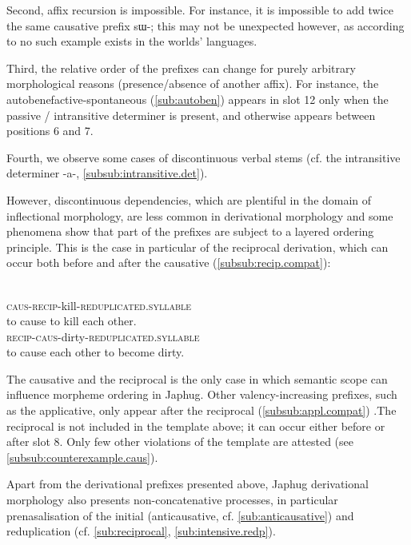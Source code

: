 \documentclass[oldfontcommands,oneside,a4paper,11pt]{memoir}
\newcommand{\ipa}[1]{{\phon #1}} %
\newcommand{\caus}{\textsc{caus}}
\newcommand{\recip}{\textsc{recip}}
\begin{document}
   
Second, affix recursion is impossible. For instance, it is impossible to add twice the same causative prefix \ipa{sɯ-}; this may not be unexpected however, as according to \citet[61]{dixon00causative} no such example exists in the worlds' languages.

Third, the relative order of the prefixes can change for purely arbitrary morphological reasons (presence/absence of another affix). For instance, the autobenefactive-spontaneous (\ref{sub:autoben}) appears in slot 12 only when the passive / intransitive determiner is present, and otherwise appears between positions 6 and 7. 

Fourth, we observe some cases of discontinuous verbal stems (cf. the intransitive determiner \ipa{-a-}, \ref{subsub:intransitive.det}). 

 
 However, discontinuous dependencies, which are plentiful in the domain of inflectional morphology, are  less common in derivational morphology and some phenomena show that part of the prefixes are subject to a layered ordering principle. This is the case in particular of the reciprocal derivation, which can occur both before and after the causative (\ref{subsub:recip.compat}):
 
    \begin{exe}
\ex
\gll   \ipa{sɯ-ɤ-sɯ-sat} \\
		\caus{}-\recip{}-kill-\textsc{reduplicated.syllable} \\
 \glt to  cause to kill each other.
\gll   \ipa{a-sɯ-ɴqʰɯ-ɴqʰi} \\
		\recip{}-\caus{}-dirty-\textsc{reduplicated.syllable} \\
 \glt to  cause each other to become dirty.
\end{exe} 
The causative and the reciprocal is the only case in which semantic scope can influence morpheme ordering in Japhug. Other valency-increasing prefixes, such as the applicative, only appear after the reciprocal (\ref{subsub:appl.compat}) .The reciprocal is not included in the template above; it can occur either before or after slot 8.
Only few other violations of the template are attested (see \ref{subsub:counterexample.caus}).


Apart from the derivational prefixes presented above, Japhug derivational morphology also presents non-concatenative processes, in particular   prenasalisation of the initial (anticausative, cf. \ref{sub:anticausative}) and reduplication (cf. \ref{sub:reciprocal}, \ref{sub:intensive.redp}).
\end{document}
